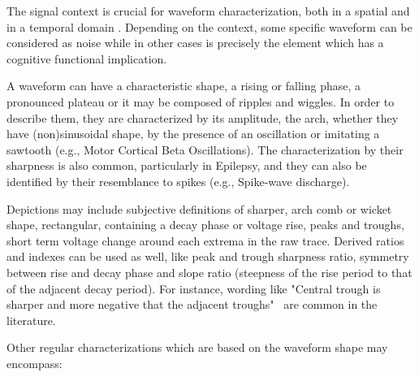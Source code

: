 \documentclass[brainsci,article,accept,moreauthors,pdftex,10pt,a4paper]{mdpi}
\begin{document}
The signal context is crucial for waveform characterization, both in a spatial and in a temporal domain \citep{Jansen1991}.  Depending on the context, some specific waveform can be considered as noise while in other cases is precisely the element which has a cognitive functional implication.



%

A waveform can have a characteristic shape, a rising or falling phase, a pronounced plateau or it may be composed of ripples and wiggles. In order to describe them, they are characterized by its amplitude, the arch, whether they have (non)sinusoidal shape, by the presence of an oscillation or imitating a sawtooth (e.g., Motor Cortical Beta Oscillations).  The characterization by their sharpness is also common, particularly in Epilepsy, and they can also be identified by their resemblance to spikes (e.g., Spike-wave discharge).

Depictions may include subjective definitions of sharper, arch comb or wicket shape, rectangular, containing a decay phase or voltage rise, peaks and troughs, short term voltage change around each extrema in the raw trace.  Derived ratios and indexes can be used as well, like peak and trough sharpness ratio, symmetry between rise and decay phase and slope ratio (steepness of the rise period to that of the adjacent decay period).  For instance,  wording like "Central trough is sharper and more negative that the adjacent troughs"~\citep{Cole2017} are common in the literature.

Other regular characterizations which are based on the waveform shape may encompass:
\end{document}
